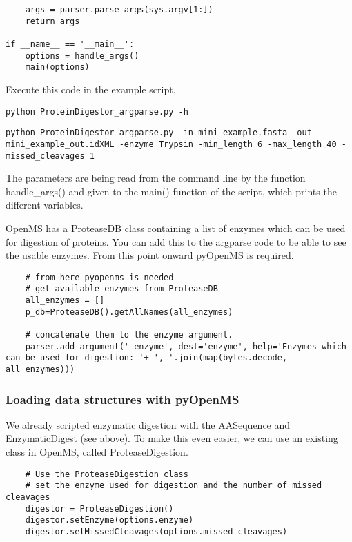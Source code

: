 {\begin{lstlisting}
    args = parser.parse_args(sys.argv[1:])
    return args

if __name__ == '__main__':
    options = handle_args()
    main(options)
\end{lstlisting}

\noindent Execute this code in the example script.
\begin{lstlisting}
python ProteinDigestor_argparse.py -h
\end{lstlisting}

\begin{lstlisting}
python ProteinDigestor_argparse.py -in mini_example.fasta -out mini_example_out.idXML -enzyme Trypsin -min_length 6 -max_length 40 -missed_cleavages 1
\end{lstlisting}

\noindent The parameters are being read from the command line by the function handle\_args() and given to the main() function of the script, which prints the different variables.

\noindent OpenMS has a ProteaseDB  class containing a list of enzymes which can be used for digestion of proteins. You can add this to the argparse code to be able to see the usable enzymes. From this point onward pyOpenMS is required. 
\begin{lstlisting}
    # from here pyopenms is needed
    # get available enzymes from ProteaseDB
    all_enzymes = []
    p_db=ProteaseDB().getAllNames(all_enzymes)
    
    # concatenate them to the enzyme argument.
    parser.add_argument('-enzyme', dest='enzyme', help='Enzymes which can be used for digestion: '+ ', '.join(map(bytes.decode, all_enzymes)))
\end{lstlisting}

\subsubsection{Loading data structures with pyOpenMS}
We already scripted enzymatic digestion with the AASequence and EnzymaticDigest (see above). To make this even easier, we can use an existing class in OpenMS, called ProteaseDigestion.

\begin{lstlisting}
    # Use the ProteaseDigestion class
    # set the enzyme used for digestion and the number of missed cleavages
    digestor = ProteaseDigestion()
    digestor.setEnzyme(options.enzyme)
    digestor.setMissedCleavages(options.missed_cleavages)
    

\end{lstlisting}}
